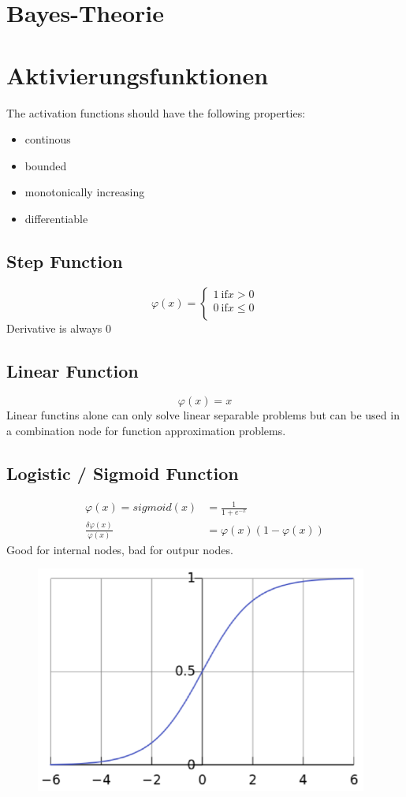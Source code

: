 \documentclass[paper=a4, fontsize=11pt]{scrartcl} %
\begin{document}
\section{Bayes-Theorie}

\section{Aktivierungsfunktionen}
The activation functions should have the following properties:
\begin{itemize}
	\item continous
	\item bounded
	\item monotonically increasing
	\item differentiable
\end{itemize}
\subsection{Step Function}
\label{ssect:linear-function}
\[
\varphi(x) = \begin{cases}
1 \: \text{if} x > 0 \\
0 \: \text{if} x \leq 0 \\
\end{cases}
\]
Derivative is always 0
\subsection{Linear Function}
\label{ssect:linear-function}
\[
\varphi(x) = x
\]
Linear functins alone can only solve linear separable problems but can be used in a combination node for function approximation problems.
\subsection{Logistic / Sigmoid Function}
\label{ssect:logistic-function}
\begin{align*}
\varphi(x) = sigmoid(x) &= \frac{1}{1 + e^{-x}} \\
\frac{\delta \varphi(x)}{\varphi(x)} &= \varphi(x) (1 - \varphi(x))
\end{align*}
Good for internal nodes, bad for outpur nodes.
\begin{figure}[h]
\includegraphics[scale=0.4]{img/sigmoid}
\end{figure}
\end{document}
